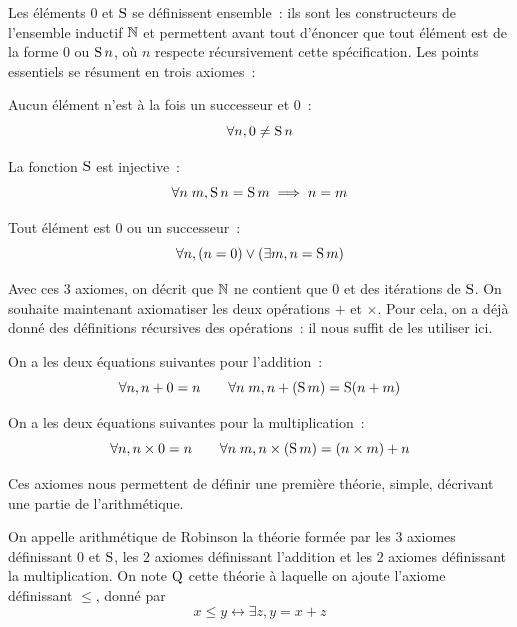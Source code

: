 Les éléments $0$ et $\operatorname{S}$ se définissent ensemble~: ils sont les constructeurs
de l'ensemble inductif $\mathbb N$ et permettent avant tout d'énoncer que tout élément
est de la forme $0$ ou $\operatorname{S} n$, où $n$ respecte récursivement cette
spécification. Les points essentiels se résument en trois axiomes~:
\begin{axiom}
  Aucun élément n'est à la fois un successeur et $0$~:
  \[\forall n, 0 \neq \operatorname{S} n\]
\end{axiom}

\begin{axiom}
  La fonction $\operatorname{S}$ est injective~:
  \[\forall n\;m, \operatorname{S} n = \operatorname{S} m \implies n = m\]
\end{axiom}

\begin{axiom}
  Tout élément est $0$ ou un successeur~:
  \[\forall n, (n = 0) \lor (\exists m, n = \operatorname{S} m)\]
\end{axiom}

Avec ces $3$ axiomes, on décrit que $\mathbb N$ ne contient que $0$ et des itérations
de $\operatorname{S}$.
On souhaite maintenant axiomatiser les deux opérations $+$ et $\times$. Pour
cela, on a déjà donné des définitions récursives des opérations~: il nous
suffit de les utiliser ici.

\begin{axiom}
  On a les deux équations suivantes pour l'addition~:
  \[\forall n, n + 0 = n \qquad \forall n\;m, n + (\operatorname{S} m) = \operatorname{S} (n+m)\]
\end{axiom}

\begin{axiom}
  On a les deux équations suivantes pour la multiplication~:
  \[\forall n, n \times 0 = n \qquad
  \forall n\;m, n \times (\operatorname{S} m) = (n\times m) + n\]
\end{axiom}

Ces axiomes nous permettent de définir une première théorie, simple, décrivant
une partie de l'arithmétique.

\begin{definition}
  On appelle arithmétique de Robinson la théorie formée par les $3$ axiomes
  définissant $0$ et $\operatorname{S}$, les $2$ axiomes définissant l'addition et les $2$
  axiomes définissant la multiplication. On note $\ArithRobin$ cette théorie
  à laquelle on ajoute l'axiome définissant $\leq$, donné par
  \[x \leq y \leftrightarrow \exists z, y = x + z\]
  \index[notation]{$\ArithRobin$}
\end{definition}

